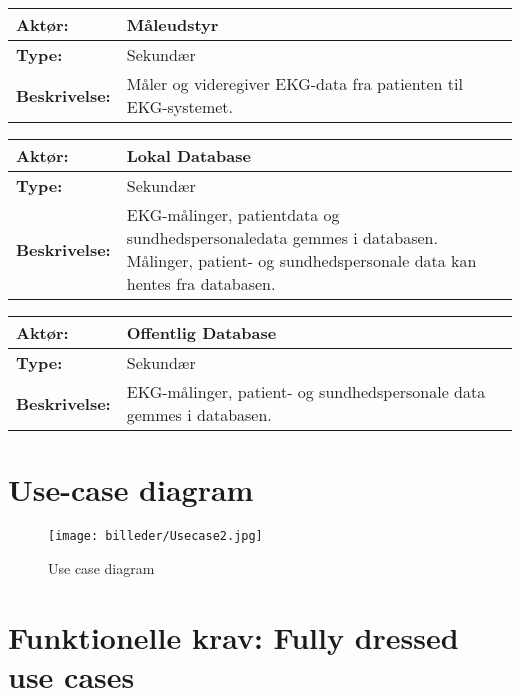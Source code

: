 \begin{table}[H]
\begin{tabular}{|l|p{13cm}|}
\hline
\textbf{Aktør:} & \textbf{Måleudstyr}\\\hline
\textbf{Type:} & Sekundær \\\hline
\textbf{Beskrivelse:} & Måler og videregiver EKG-data fra patienten til EKG-systemet. \\\hline
\end{tabular}
\end{table}

\begin{table}[H]
\begin{tabular}{|l|p{13cm}|}
\hline
\textbf{Aktør:} & \textbf{Lokal Database}\\\hline
\textbf{Type:} & Sekundær \\\hline
\textbf{Beskrivelse:} & EKG-målinger, patientdata og sundhedspersonaledata gemmes i databasen. Målinger, patient- og sundhedspersonale data kan hentes fra databasen.  \\\hline
\end{tabular}
\end{table}

\begin{table}[H]
\begin{tabular}{|l|p{13cm}|}
\hline
\textbf{Aktør:} & \textbf{Offentlig Database}\\\hline
\textbf{Type:} & Sekundær \\\hline
\textbf{Beskrivelse:} & EKG-målinger, patient- og sundhedspersonale data gemmes i databasen. \\\hline
\end{tabular}
\end{table}

\section{Use-case diagram}
\begin{figure}[H]
\centering
\texttt{[image: billeder/Usecase2.jpg]}
\caption{Use case diagram}
\label{fig:aktør-kontekst}
\end{figure}
\newpage

\section{Funktionelle krav: Fully dressed use cases}
